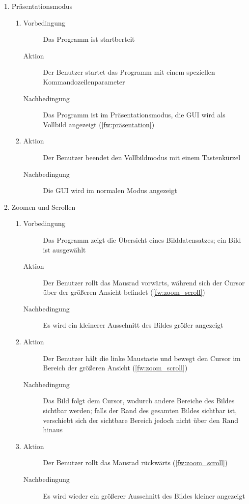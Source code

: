 \begin{enumerate} [label=\bfseries /TSW \arabic*0/, leftmargin=*]
	\item Präsentationsmodus \label{ts:präsentation}
	\begin{enumerate}[leftmargin=0pt]
		\item
		\begin{description}
			\item[Vorbedingung]Das Programm ist startberteit
			\item[Aktion] Der Benutzer startet das Programm mit einem speziellen Kommandozeilenparameter
			\item[Nachbedingung] Das Programm ist im Präsentationsmodus, die GUI wird als Vollbild angezeigt (\ref{fw:präsentation})
		\end{description}
		\item
		\begin{description}
			\item[Aktion] Der Benutzer beendet den Vollbildmodus mit einem Tastenkürzel
			\item[Nachbedingung] Die GUI wird im normalen Modus angezeigt
		\end{description}
	\end{enumerate}

	\item Zoomen und Scrollen \label{ts:zoom_scroll}
	\begin{enumerate}[leftmargin=0pt]
		\item
		\begin{description}
			\item[Vorbedingung] Das Programm zeigt die Übersicht eines Bilddatensatzes; ein Bild ist ausgewählt
			\item[Aktion] Der Benutzer rollt das Mausrad vorwärts, während sich der Cursor über der größeren Ansicht befindet (\ref{fw:zoom_scroll})
			\item[Nachbedingung] Es wird ein kleinerer Ausschnitt des Bildes größer angezeigt
		\end{description}
		\item
		\begin{description}
			\item[Aktion] Der Benutzer hält die linke Maustaste und bewegt den Cursor im Bereich der größeren Ansicht (\ref{fw:zoom_scroll})
			\item[Nachbedingung] Das Bild folgt dem Cursor, wodurch andere Bereiche des Bildes sichtbar werden; falls der Rand des gesamten Bildes sichtbar ist, verschiebt sich der sichtbare Bereich jedoch nicht über den Rand hinaus
		\end{description}
		\item
		\begin{description}
			\item[Aktion] Der Benutzer rollt das Mausrad rückwärts (\ref{fw:zoom_scroll})
			\item[Nachbedingung] Es wird wieder ein größerer Ausschnitt des Bildes kleiner angezeigt
		\end{description}
	\end{enumerate}


\end{enumerate}

